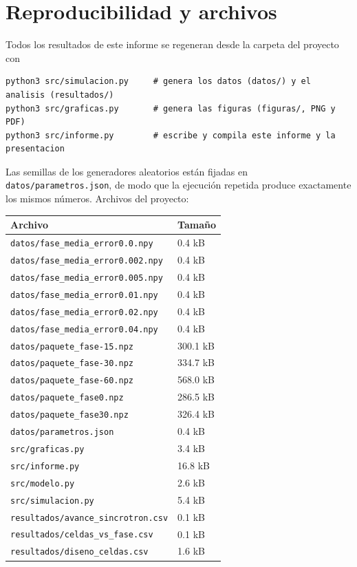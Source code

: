 \documentclass[11pt,a4paper]{article}
\begin{document}
\section{Reproducibilidad y archivos}
Todos los resultados de este informe se regeneran desde la carpeta del proyecto con
\begin{verbatim}
python3 src/simulacion.py     # genera los datos (datos/) y el analisis (resultados/)
python3 src/graficas.py       # genera las figuras (figuras/, PNG y PDF)
python3 src/informe.py        # escribe y compila este informe y la presentacion
\end{verbatim}
Las semillas de los generadores aleatorios están fijadas en \texttt{datos/parametros.json}, de modo que
la ejecución repetida produce exactamente los mismos números. Archivos del proyecto:
{\small
\begin{longtable}{ll}
\toprule
Archivo & Tamaño \\
\midrule
\texttt{datos/fase\_media\_error0.0.npy} & 0.4 kB \\
\texttt{datos/fase\_media\_error0.002.npy} & 0.4 kB \\
\texttt{datos/fase\_media\_error0.005.npy} & 0.4 kB \\
\texttt{datos/fase\_media\_error0.01.npy} & 0.4 kB \\
\texttt{datos/fase\_media\_error0.02.npy} & 0.4 kB \\
\texttt{datos/fase\_media\_error0.04.npy} & 0.4 kB \\
\texttt{datos/paquete\_fase-15.npz} & 300.1 kB \\
\texttt{datos/paquete\_fase-30.npz} & 334.7 kB \\
\texttt{datos/paquete\_fase-60.npz} & 568.0 kB \\
\texttt{datos/paquete\_fase0.npz} & 286.5 kB \\
\texttt{datos/paquete\_fase30.npz} & 326.4 kB \\
\texttt{datos/parametros.json} & 0.4 kB \\
\texttt{src/graficas.py} & 3.4 kB \\
\texttt{src/informe.py} & 16.8 kB \\
\texttt{src/modelo.py} & 2.6 kB \\
\texttt{src/simulacion.py} & 5.4 kB \\
\texttt{resultados/avance\_sincrotron.csv} & 0.1 kB \\
\texttt{resultados/celdas\_vs\_fase.csv} & 0.1 kB \\
\texttt{resultados/diseno\_celdas.csv} & 1.6 kB \\

\end{longtable}}
\end{document}
